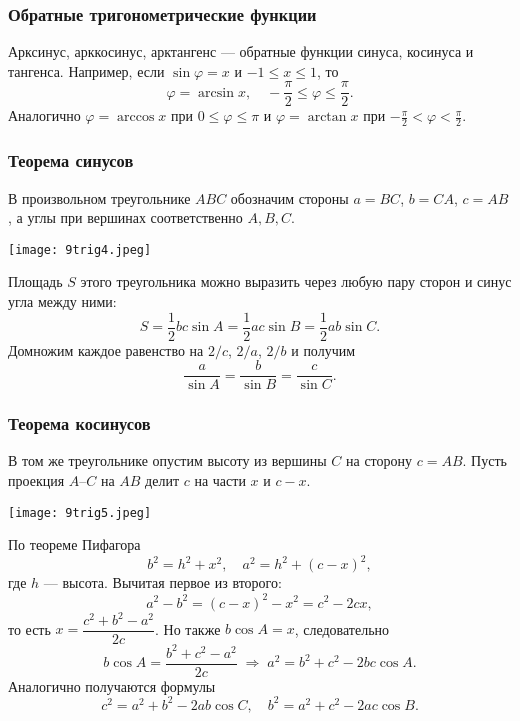 \documentclass[12pt, a4paper]{article}%
\begin{document}
\subsubsection*{Обратные тригонометрические функции}
Арксинус, арккосинус, арктангенс — обратные функции синуса, косинуса и тангенса. Например, если $\sin\varphi = x$ и $-1\le x\le1$, то
\[
\varphi = \arcsin x,\quad -\frac{\pi}{2}\le \varphi\le\frac{\pi}{2}.
\]
Аналогично $\varphi = \arccos x$ при $0\le\varphi\le\pi$ и $\varphi = \arctan x$ при $-\frac{\pi}{2}<\varphi<\frac{\pi}{2}$.

\subsubsection*{Теорема синусов}
В произвольном треугольнике \(ABC\) обозначим стороны \(a=BC\), \(b=CA\), \(c=AB\),
а углы при вершинах соответственно \(A,B,C\).


\begin{center}
\texttt{[image: 9trig4.jpeg]}
\label{fig:mpr}
\end{center}



Площадь \(S\) этого треугольника можно выразить через любую пару сторон и синус угла между ними:
\[
S = \frac12 bc\sin A = \frac12 a c\sin B = \frac12 a b\sin C.
\]
Домножим каждое равенство на \(2/c\), \(2/a\), \(2/b\) и получим
\[
\frac{a}{\sin A} = \frac{b}{\sin B} = \frac{c}{\sin C}.
\]

\subsubsection*{Теорема косинусов}
В том же треугольнике опустим высоту из вершины \(C\) на сторону \(c=AB\). Пусть проекция \(A\)–\(C\) на \(AB\) делит \(c\) на части \(x\) и \(c-x\).

\begin{center}
\texttt{[image: 9trig5.jpeg]}
\label{fig:mpr}
\end{center}



По теореме Пифагора
\[
b^2 = h^2 + x^2,\quad a^2 = h^2 + (c-x)^2,
\]
где \(h\) — высота. Вычитая первое из второго:
\[
a^2 - b^2 = (c-x)^2 - x^2 = c^2 - 2cx,
\]
то есть \(x = \dfrac{c^2 + b^2 - a^2}{2c}\). Но также \(b\cos A = x\), следовательно
\[
b\cos A = \frac{b^2 + c^2 - a^2}{2c}
\;\Longrightarrow\;
a^2 = b^2 + c^2 - 2bc\cos A.
\]
Аналогично получаются формулы
\[
c^2 = a^2 + b^2 - 2ab\cos C,\quad
b^2 = a^2 + c^2 - 2ac\cos B.
\]
\end{document}
